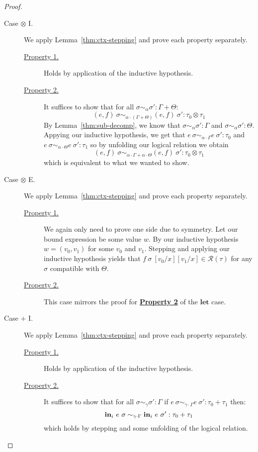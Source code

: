 \begin{proof}
\begin{description}
    \item[Case $\otimes$ I.] 
      We apply Lemma~\ref{thm:ctx-stepping} and prove each property separately.
      \begin{description}
        \item[\underline{Property 1.}]
          Holds by application of the inductive hypothesis.
        \item[\underline{Property 2.}]
          It suffices to show that for all 
          $\sigma \sim_{\alpha} \sigma' : \Gamma + \Theta$:
          $$
          (e, f)~\sigma \sim_{\alpha \cdot (\Gamma + \Theta)} (e, f)~\sigma' :
          \tau_0 \otimes \tau_1
          $$
          By Lemma~\ref{thm:sub-decomp}, we know that 
          $\sigma \sim_{\alpha} \sigma' : \Gamma$ and
          $\sigma \sim_{\alpha} \sigma' : \Theta$.
          Appying our inductive hypothesis, we get that
          $e~\sigma \sim_{\alpha \cdot \Gamma} e~\sigma' : \tau_0$ and
          $e~\sigma \sim_{\alpha \cdot \Theta} e~\sigma' : \tau_1$
          so by unfolding our logical relation we obtain
          $$
          (e, f)~\sigma \sim_{\alpha \cdot \Gamma + \alpha \cdot \Theta} (e, f)~\sigma' :
          \tau_0 \otimes \tau_1
          $$
          which is equivalent to what we wanted to show.
      \end{description}

    \item[Case $\otimes$ E.] 
      We apply Lemma~\ref{thm:ctx-stepping} and prove each property separately.
      \begin{description}
        \item[\underline{Property 1.}]
          We again only need to prove one side due to symmetry. Let our bound
          expression be some value $w$. By our inductive hypothesis $w = (v_0,
          v_1)$ for some $v_0$ and $v_1$. Stepping and applying our inductive
          hypothesis yields that $f~\sigma~[v_0/x][v_1/x] \in
          \mathcal{R}(\tau)$ for any $\sigma$ compatible with $\Theta$.
        \item[\underline{Property 2.}]
          This case mirrors the proof for \textbf{\underline{Property 2}} of the
          $\textbf{let}$ case.
      \end{description}

    \item[Case $+$ I.] 
      We apply Lemma~\ref{thm:ctx-stepping} and prove each property separately.
      \begin{description}
        \item[\underline{Property 1.}]
          Holds by application of the inductive hypothesis.
        \item[\underline{Property 2.}]
          It suffices to show that for all $\sigma \sim_{\gamma} \sigma' : \Gamma$
          if $e~\sigma \sim_{\gamma \cdot \Gamma} e~\sigma' : \tau_0 + \tau_1$
          then:
          $$
          \textbf{in}_i~e~\sigma \sim_{\gamma \cdot \Gamma} \textbf{in}_i~e~\sigma' : \tau_0 +
          \tau_1
          $$
          which holds by stepping and some unfolding of the logical relation.
      \end{description}


\end{description}
\end{proof}
